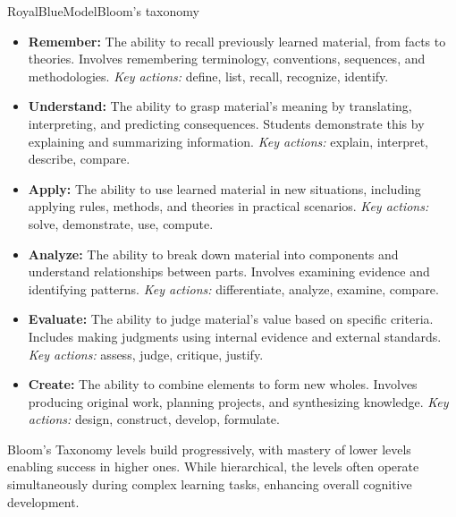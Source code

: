 \begin{educardb}{RoyalBlue}{\faShapes}{Model}{Bloom's taxonomy}

\begin{itemize}[leftmargin=4mm]

\item \textbf{Remember:} The ability to recall previously learned material, from facts to theories. Involves remembering terminology, conventions, sequences, and methodologies. \textit{Key actions:} define, list, recall, recognize, identify.

\item \textbf{Understand:} The ability to grasp material's meaning by translating, interpreting, and predicting consequences. Students demonstrate this by explaining and summarizing information. \textit{Key actions:} explain, interpret, describe, compare.

\item \textbf{Apply:} The ability to use learned material in new situations, including applying rules, methods, and theories in practical scenarios. \textit{Key actions:} solve, demonstrate, use, compute.

\item \textbf{Analyze:} The ability to break down material into components and understand relationships between parts. Involves examining evidence and identifying patterns. \textit{Key actions:} differentiate, analyze, examine, compare.

\item \textbf{Evaluate:} The ability to judge material's value based on specific criteria. Includes making judgments using internal evidence and external standards. \textit{Key actions:} assess, judge, critique, justify.

\item \textbf{Create:} The ability to combine elements to form new wholes. Involves producing original work, planning projects, and synthesizing knowledge. \textit{Key actions:} design, construct, develop, formulate.

\end{itemize}

Bloom's Taxonomy levels build progressively, with mastery of lower levels enabling success in higher ones. While hierarchical, the levels often operate simultaneously during complex learning tasks, enhancing overall cognitive development.

\end{educardb}